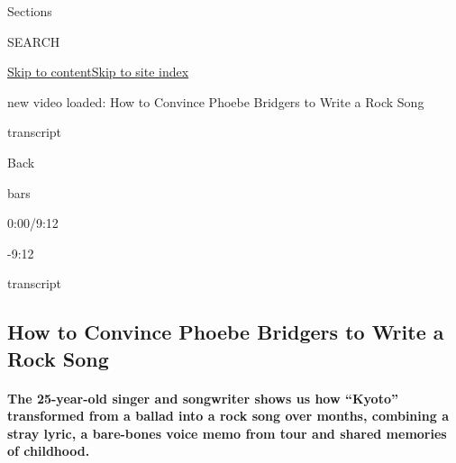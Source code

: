 Sections

SEARCH

\protect\hyperlink{site-content}{Skip to
content}\protect\hyperlink{site-index}{Skip to site index}

new video loaded: How to Convince Phoebe Bridgers to Write a Rock Song

transcript

Back

bars

0:00/9:12

-9:12

transcript

\hypertarget{how-to-convince-phoebe-bridgers-to-write-a-rock-song}{%
\subsection{How to Convince Phoebe Bridgers to Write a Rock
Song}\label{how-to-convince-phoebe-bridgers-to-write-a-rock-song}}

\hypertarget{the-25-year-old-singer-and-songwriter-shows-us-how-kyoto-transformed-from-a-ballad-into-a-rock-song-over-months-combining-a-stray-lyric-a-bare-bones-voice-memo-from-tour-and-shared-memories-of-childhood}{%
\paragraph{The 25-year-old singer and songwriter shows us how ``Kyoto''
transformed from a ballad into a rock song over months, combining a
stray lyric, a bare-bones voice memo from tour and shared memories of
childhood.}\label{the-25-year-old-singer-and-songwriter-shows-us-how-kyoto-transformed-from-a-ballad-into-a-rock-song-over-months-combining-a-stray-lyric-a-bare-bones-voice-memo-from-tour-and-shared-memories-of-childhood}}

